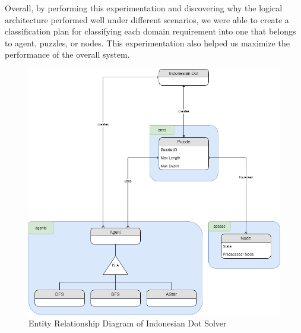 Overall, by performing this experimentation and discovering why the logical architecture performed well under different scenarios, we were able to create a classification plan for classifying each domain requirement into one that belongs to agent, puzzles, or nodes. This experimentation also helped us maximize the performance of the overall system.

\begin{figure}[H]
\includegraphics[width=0.75\linewidth]{assets/schema.png}
\caption{Entity Relationship Diagram of Indonesian Dot Solver} \label{fig2}
\end{figure}
